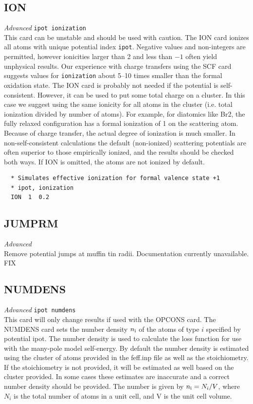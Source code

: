 \documentclass[11pt,oneside]{report} %
\renewcommand{\htmlref}[2]{\hyperlink{#2}{#1}}
\newenvironment{Card}[4]%
      {\vspace{3ex}%
        \subsection{#1}
        \quad\textsl{#3}\newline
        \quad\texttt{#2}\newline%
        \label{card:#4}\\}
      {}
\renewcommand{\htmlref}[2]{{#1}} %
\begin{document}
\begin{Card}{ION}{ipot ionization}{Advanced}{ion}
  This card can be unstable and should be used with caution.
  The ION card ionizes all atoms with unique potential index
  \texttt{ipot}. Negative values and non-integers are permitted,
  however ionicities larger than 2 and less than $-1$ often yield
  unphysical results. Our experience with charge transfers using the
  SCF card suggests values for \texttt{ionization} about 5--10 times
  smaller than the formal oxidation state. The ION card is probably
  not needed if the potential is self-consistent. However, it can be
  used to put some total charge on a cluster. In this case we suggest
  using the same ionicity for all atoms in the cluster (i.e. total
  ionization divided by number of atoms). For example, for diatomics
  like Br2, the fully relaxed configuration has a formal ionization of
  1 on the scattering atom. Because of charge transfer, the actual
  degree of ionization is much smaller. In non-self-consistent
  calculations the default (non-ionized) scattering potentials are
  often superior to those empirically ionized, and the results should
  be checked both ways. If ION is omitted, the atoms are not ionized 
  by default.
\begin{verbatim}
  * Simulates effective ionization for formal valence state +1
  * ipot, ionization
  ION  1  0.2
\end{verbatim}
\end{Card}



\begin{Card}{JUMPRM}{}{Advanced}{jum}
  Remove potential jumps at muffin tin radii.  Documentation currently unavailable. FIX
\end{Card}



\begin{Card}{NUMDENS}{ipot numdens}{Advanced}{num}
  This card will only change results if used with the
  \htmlref{OPCONS}{card:opc} card.
  The NUMDENS card sets the number density $n_{\rm i}$ of
  the atoms of type 
  $i$ specified by potential ipot. The number density is used to
  calculate the loss function for use with the many-pole model
  self-energy. By default the number density is
  estimated using the cluster of atoms provided in the feff.inp file
  as well as the 
  stoichiometry. If the stoichiometry is not provided, it will be
  estimated as well based on the cluster provided.
  In some cases these estimates are inaccurate and a correct number
  density should be provided. The number is given by $n_{\rm i} = N_{i}/V$,
  where $N_{i}$ is the total number of atoms in a unit cell, and V is
  the unit cell volume.
\end{Card}
\end{document}
